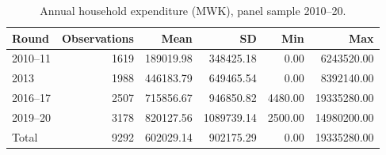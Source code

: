 \begin{table}[ht]
\centering
\caption{Annual household expenditure (MWK), panel sample 2010--20.} 
\label{tab:A1}
\begin{tabular}{lrrrrr}
  \hline
Round & Observations & Mean & SD & Min & Max \\ 
  \hline
2010--11 & 1619 & 189019.98 & 348425.18 & 0.00 & 6243520.00 \\ 
  2013 & 1988 & 446183.79 & 649465.54 & 0.00 & 8392140.00 \\ 
  2016--17 & 2507 & 715856.67 & 946850.82 & 4480.00 & 19335280.00 \\ 
  2019--20 & 3178 & 820127.56 & 1089739.14 & 2500.00 & 14980200.00 \\ 
  Total & 9292 & 602029.14 & 902175.29 & 0.00 & 19335280.00 \\ 
   \hline
\end{tabular}
\end{table}

